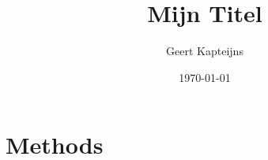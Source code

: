 \documentclass[9pt, ebook, openany, oneside]{memoir}
\renewcommand{\afterchaptertitle}{%
 \vskip2em
 \hrule height 0.6pt
 \vskip2em
 }
\begin{document}
\renewcommand{\abstractname}{}
\renewcommand{\absnamepos}{empty}

\pagestyle{simple}



\frontmatter

\title{Mijn Titel}
\author{Geert Kapteijns}
\date{\today}

% 

\begingroup
\renewcommand{\afterchaptertitle}{\vskip1.5em}

\tableofcontents*
\endgroup

% 
%
% 

\mainmatter

% 
%
% 
%
% 
%
% 
%
% 
\chapter{Methods}

% 
\end{document}
